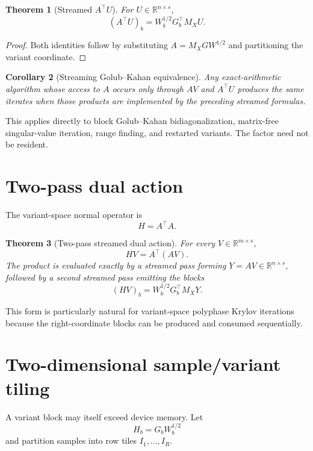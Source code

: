 \documentclass[11pt]{article}
\newtheorem{theorem}{Theorem}[section]
\newtheorem{corollary}[theorem]{Corollary}
\theoremstyle{definition}
\theoremstyle{remark}
\begin{document}
\begin{theorem}[Streamed \(A^\top U\)]\label{claim:final-10-2}
For \(U\in\mathbb R^{n\times s}\),
\[
\boxed{
(A^\top U)_b
=
W_b^{1/2}G_b^\top M_XU.
}
\]
\end{theorem}

\begin{proof}
Both identities follow by substituting
\(A=M_XGW^{1/2}\) and partitioning the variant coordinate.
\end{proof}

\begin{corollary}[Streaming Golub--Kahan equivalence]\label{claim:final-10-3}
Any exact-arithmetic algorithm whose access to \(A\) occurs only through
\(AV\) and \(A^\top U\) produces the same iterates when those products are
implemented by the preceding streamed formulas.
\end{corollary}

This applies directly to block Golub--Kahan bidiagonalization, matrix-free
singular-value iteration, range finding, and restarted variants.  The
factor need not be resident.

\section{Two-pass dual action}\label{sec:final-11}

The variant-space normal operator is
\[
H=A^\top A.
\]

\begin{theorem}[Two-pass streamed dual action]\label{claim:final-11-1}
For every \(V\in\mathbb R^{m\times s}\),
\[
\boxed{
HV=A^\top(AV).
}
\]
The product is evaluated exactly by a streamed pass forming
\(Y=AV\in\mathbb R^{n\times s}\), followed by a second streamed pass
emitting the blocks
\[
(HV)_b=W_b^{1/2}G_b^\top M_XY.
\]
\end{theorem}

This form is particularly natural for variant-space polyphase Krylov
iterations because the right-coordinate blocks can be produced and consumed
sequentially.

\section{Two-dimensional sample/variant tiling}\label{sec:final-12}

A variant block may itself exceed device memory.  Let
\[
H_b=G_bW_b^{1/2}
\]
and partition samples into row tiles \(I_1,\ldots,I_R\).
\end{document}
